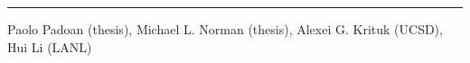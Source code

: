
\rule[3pt]{425.5pt}{.1mm}

\noindent Paolo Padoan (thesis), Michael L. Norman (thesis), Alexei G. Krituk (UCSD), Hui
Li (LANL)
